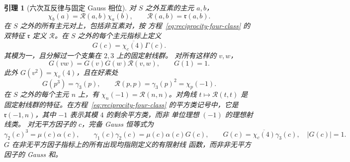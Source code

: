 \documentclass[11pt,a4paper]{article}
\numberwithin{equation}{section}
\numberwithin{figure}{section}
\newtheorem{lemma}[theorem]{引理}
\theoremstyle{definition}
\theoremstyle{remark}
\begin{document}
\begin{lemma}[六次互反律与固定 Gauss 相位]
\label{lem:fixed-gauss-phase}
对 $S$ 之外互素的主元 $a,b$，
\[
 \chi_b(a)=\mathcal R(a,b)\chi_a(b),\qquad
 \mathcal R(a,b)=\mathfrak r(a,b).
\]
在 $S$ 之外的所有主元对上，包括非互素对，按
方程~\eqref{eq:reciprocity-four-class} 的双特征 $\mathfrak r$
定义 $\mathcal R$。在 $S$ 之外的每个主元指标上定义
\[
 G(c)=\overline{\chi_c(4)}\Gamma(c).
\]
其模为一，且分解过一个支集在 $2,3$ 上的固定射线群。
对所有这样的 $v,w$，
\begin{equation}\label{eq:G-quadratic-refinement}
 G(vw)=G(v)G(w)\mathcal R(v,w),\qquad G(1)=1.
\end{equation}
此外 $G(v^2)=\chi_v(4)$，且在好素处
\begin{equation}\label{eq:fixed-gauss-phases}
 G(p^3)=\gamma_3(p),\qquad
 \mathcal R(p,p)=\gamma_3(p)^2=\chi_p(-1).
\end{equation}
在 $S$ 之外的每个主元 $n$ 上，有
$\chi_n(-1)=\mathcal R(n,n)$。对角线 $t\mapsto\mathcal R(t,t)$ 是
固定射线群的特征。在方程~\eqref{eq:reciprocity-four-class}
的平方类记号中，它是 $\mathfrak r(-1,n)$，其中
$-1$ 表示其模 $4$ 的剩余平方类，而非
单位理想 $(-1)$ 的理想射线类。
对无平方因子的 $c$，完备 Gauss 恒等式为
\begin{equation}\label{eq:signal}
 \gamma_2(c)^3=\mu(c)\alpha(c),\qquad
 \gamma_1(c)\gamma_2(c)=\mu(c)\alpha(c)G(c),\qquad
 G(c)=\overline{\chi_c(4)}\gamma_3(c),\quad |G(c)|=1.
\end{equation}
$G$ 在非无平方因子指标上的所有出现均指刚定义的有限射线
函数，而非非无平方因子的 Gauss 和。
\end{lemma}
\end{document}
